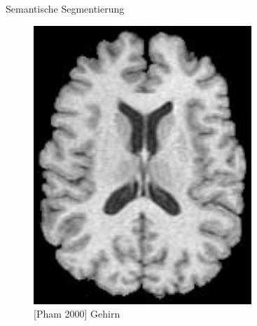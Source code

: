 \begin{frame}{Semantische Segmentierung}
\begin{figure}[ht]
\begin{minipage}[b]{0.45\linewidth}
            \includegraphics[width=\textwidth]{../images/brain-mr.png}
            \caption{[Pham 2000] Gehirn}
            \label{fig:lung}
        \end{minipage}
    \end{figure}
\end{frame}

